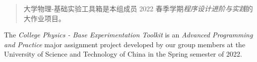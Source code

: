 

\begin{abstract}

大学物理-基础实验工具箱是本组成员 2022 春季学期\textit{程序设计进阶与实践}的大作业项目。

\end{abstract}

\begin{abstract*}

The \textit{College Physics - Base Experimentation Toolkit} is an \textit{Advanced Programming and Practice} major assignment project
developed by our group members at the University of Science and Technology of China in the Spring semester of 2022.

\end{abstract*}

